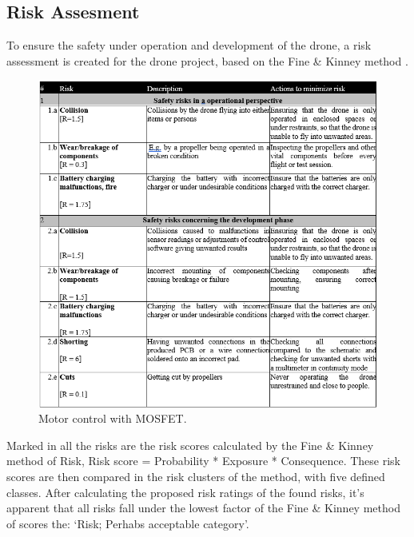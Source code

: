 \subsection{Risk Assesment}

To ensure the safety under operation and development of the drone, a risk assessment is created for the drone project, based on the Fine \& Kinney method \cite{finekinney}.

\begin{figure}[H]
    \begin{center}
    \includegraphics[scale=0.7]{pictures/Risk assesment table.png}
    \end{center}
    \caption{Motor control with MOSFET.}
    \label{fig:Mosfet_Control}
\end{figure}

Marked in all the risks are the risk scores calculated by the Fine \& Kinney method of Risk, Risk score = Probability * Exposure * Consequence. These risk scores are then compared in the risk clusters of the method, with five defined classes. After calculating the proposed risk ratings of the found risks, it’s apparent that all risks fall under the lowest factor of the Fine \& Kinney method of scores the: ‘Risk; Perhabs acceptable category’. 
